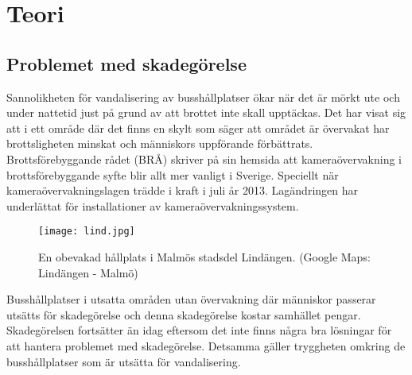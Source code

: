 
\chapter{Teori} %
\label{teori}

\ifpdf
    \graphicspath{{3_theory/figures/PNG/}{3/figures/PDF/}{3/figures/}}
\else
    \graphicspath{{3_theory/figures/EPS/}{3/figures/}}
\fi

\graphicspath{{3_theory/figures/}{3/figures/}}


\section{Problemet med skadegörelse}

Sannolikheten för vandalisering av busshållplatser ökar när det är mörkt ute och under nattetid just på grund av att brottet inte skall upptäckas. Det har visat sig att i ett område där det finns en skylt som säger att området är övervakat har brottsligheten minskat och människors uppförande förbättrats.\\ 

Brottsförebyggande rådet (BRÅ) skriver på sin hemsida att kameraövervakning i brottsförebyggande syfte blir allt mer vanligt i Sverige. Speciellt när kameraövervakningslagen trädde i kraft i juli år 2013. Lagändringen har underlättat för installationer av kameraövervakningssystem. 

\begin{figure}[h]
  \texttt{[image: lind.jpg]}
  \caption{En obevakad hållplats i Malmös stadsdel Lindängen. (Google Maps: Lindängen - Malmö)}
  \label{fig:lind}
\end{figure}

Busshållplatser i utsatta områden utan övervakning där människor passerar utsätts för skadegörelse och denna skadegörelse kostar samhället pengar. Skadegörelsen fortsätter än idag eftersom det inte finns några bra lösningar för att hantera problemet med skadegörelse. Detsamma gäller tryggheten omkring de busshållplatser som är utsätta för vandalisering.\\

